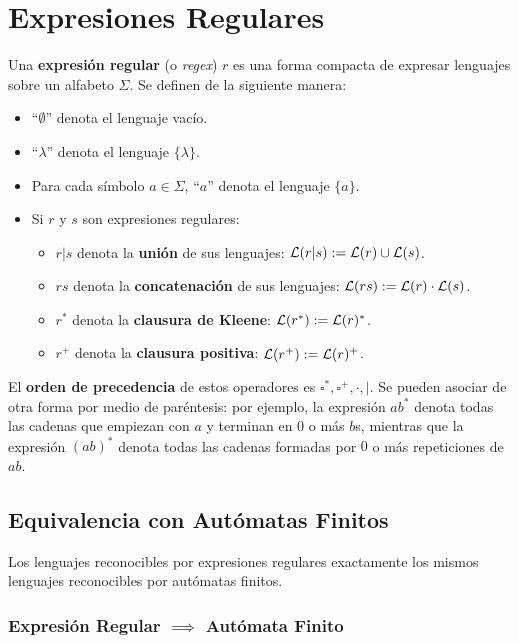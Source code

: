 
\section{Expresiones Regulares}

Una \textbf{expresión regular} (o \textit{regex}) $r$ es una forma compacta de expresar lenguajes sobre un alfabeto $\Sigma$. Se definen de la siguiente manera:
\begin{itemize}
    \item ``$\emptyset$'' denota el lenguaje vacío.
    \item ``$\lambda$'' denota el lenguaje $\{\lambda\}$.
    \item Para cada símbolo $a \in \Sigma$, ``$a$'' denota el lenguaje $\{a\}$.
    \item Si $r$ y $s$ son expresiones regulares:
          \begin{itemize}
              \item $r|s$ denota la \textbf{unión} de sus lenguajes: $\mathcal{L}(r|s) := \mathcal{L}(r) \cup \mathcal{L}(s)$.
              \item $rs$ denota la \textbf{concatenación} de sus lenguajes: $\mathcal{L}(rs) := \mathcal{L}(r) \cdot \mathcal{L}(s)$.
              \item $r^*$ denota la \textbf{clausura de Kleene}: $\mathcal{L}(r^*) := \mathcal{L}(r)^*$.
              \item $r^+$ denota la \textbf{clausura positiva}: $\mathcal{L}(r^+) := \mathcal{L}(r)^+$.
          \end{itemize}
\end{itemize}

El \textbf{orden de precedencia} de estos operadores es $\square^*, \square^+, \cdot, |$. Se pueden asociar de otra forma por medio de paréntesis: por ejemplo, la expresión $ab^*$ denota todas las cadenas que empiezan con $a$ y terminan en 0 o más $b$s, mientras que la expresión $(ab)^*$ denota todas las cadenas formadas por $0$ o más repeticiones de $ab$.

\subsection{Equivalencia con Autómatas Finitos}

Los lenguajes reconocibles por expresiones regulares exactamente los mismos lenguajes reconocibles por autómatas finitos.

\subsubsection{Expresión Regular $\implies$ Autómata Finito}


